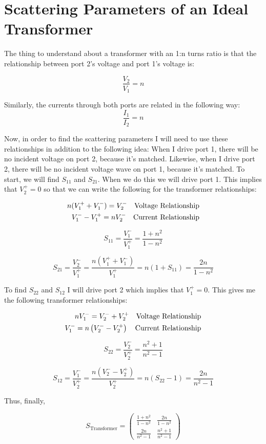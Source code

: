 \section{Scattering Parameters of an Ideal Transformer}
\setcounter{equation}{0}
\addtocounter{section}{1}

The thing to understand about a transformer with an 1:n turns ratio is that the
relationship between port 2's voltage and port 1's voltage is:

\[ 
    \frac{V_2}{V_1} = n 
\]

Similarly, the currents through both ports are related in the following way:
\[ 
    \frac{I_1}{I_2} = n 
\]

Now, in order to find the scattering parameters I will need to use these
relationships in addition to the following idea: When I drive port 1, there will
be no incident voltage on port 2, because it's matched. Likewise, when I drive
port 2, there will be no incident voltage wave on port 1, because it's matched.
To start, we will find $S_{11}$ and $S_{21}$. When we do this we will drive port
1. This implies that $V_2^+ = 0$ so that we can write the following for the
transformer relationships:

\begin{align}
    n(V_1^+ + V_1^-) = V_2^- \text{\quad Voltage Relationship} \label{port1voltage} \\
    V_1^- - V_1^+ = n V_2^- \text{\quad Current Relationship}
    \label{port1current}
\end{align}


\[ 
        S_{11} = \frac{V_1^-}{V_1^+} = \frac{1+n^2}{1-n^2}
\]

\[ 
        S_{21} = \frac{V_2^-}{V_1^+} = \frac{n \left( V_1^+ + V_1^-
        \right)}{V_1^+} = n \left( 1+S_{11} \right) = \frac{2n}{1-n^2}
\]

To find $S_{22}$ and $S_{12}$ I will drive port 2 which implies that $V_1^+ =
0$. This gives me the following transformer relationships:

\begin{align}
    nV_1^- = V_2^- + V_2^+ \text{\quad Voltage Relationship} \label{port1voltage} \\
    V_1^- = n \left( V_2^- -  V_2^+ \right) \text{\quad Current Relationship}
    \label{port1current}
\end{align}

\[ 
        S_{22} = \frac{V_2^-}{V_2^+} = \frac{n^2+1}{n^2-1}
\]

\[ 
        S_{12} = \frac{V_1^-}{V_2^+} = \frac{n \left( V_2^- - V_2^+
        \right)}{V_2^+} = n \left(  S_{22} - 1 \right) = \frac{2n}{n^2-1}
\]

Thus, finally,

\[ 
        S_{\text{Transformer}} = \begin{pmatrix}
            \frac{1+n^2}{1-n^2} & \frac{2n}{1-n^2} \\ \frac{2n}{n^2-1} &
            \frac{n^2+1}{n^2-1}
        \end{pmatrix} 
\]


